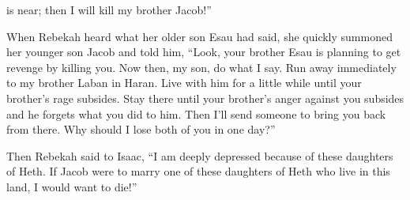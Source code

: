 {is near; then I will kill
my brother
Jacob!”
\par }{\PP {}When Rebekah
heard what
her older
son
Esau
had said, she quickly summoned
her younger
son
Jacob
and told
him,
“Look,
your brother
Esau
is planning
to get revenge by killing you.
Now
then, my son,
do what I say. Run away immediately
to
my brother
Laban
in Haran.
Live
with
him for a little while until
your brother’s
rage
subsides.
Stay there until
your brother’s
anger
against you subsides
and he forgets what
you did
to him. Then I’ll send
someone to bring
you back from
there.
Why
should I lose
both
of you in one
day?”
\par }{\PP {}Then Rebekah
said to
Isaac,
“I am deeply
depressed
because of these daughters
of Heth.
If
Jacob
were to marry
one of these
daughters
of Heth
who live
in this land,
I would want to die!”

}
